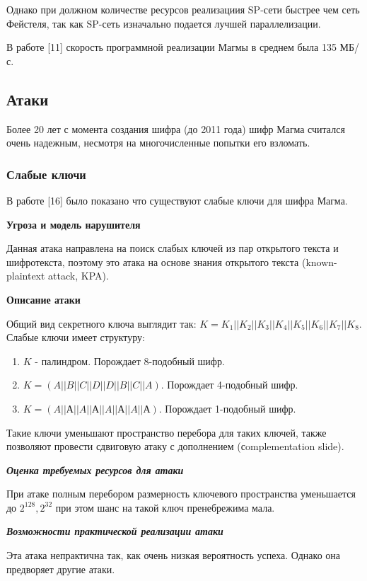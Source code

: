 \documentclass[colorthm]{./civarticle}
\begin{document}
Однако при должном количестве ресурсов реализациия SP-сети быстрее чем сеть Фейстеля, так как SP-сеть изначально подается лучшей параллелизации. 

В работе [11] скорость программной реализации Магмы в среднем была 135 МБ/с. 

\subsection{Атаки}

Более 20 лет с момента создания шифра (до 2011 года) шифр Магма считался очень надежным, несмотря на многочисленные попытки его взломать.

\subsubsection{Слабые ключи}

В работе [16] было показано что существуют слабые ключи для шифра Магма.

\textbf{Угроза и модель нарушителя} 

Данная атака направлена на поиск слабых ключей из пар открытого текста и шифротекста, поэтому это атака на основе знания открытого текста (known-plaintext attack, KPA).

\textbf{Описание атаки} 

Общий вид секретного ключа выглядит так: $K = K_1||K_2||K_3||K_4||K_5||K_6||K_7||K_8$. Слабые ключи имеет структуру:

\begin{enumerate}
    \item $K$ - палиндром. Порождает 8-подобный шифр.
    \item $K = (A||B||C||D||D||B||C||A)$. Порождает 4-подобный шифр.
    \item $K = (A||А||A||А||A||А||A||А)$. Порождает 1-подобный шифр.
\end{enumerate}

Такие ключи уменьшают пространство перебора для таких ключей, также позволяют провести сдвиговую атаку с дополнением (сomplementation slide).

\textbf{\emph{Оценка требуемых ресурсов для атаки}}

При атаке полным перебором размерность ключевого пространства уменьшается до $2^{128}, 2^{32}$ при этом шанс на такой ключ пренебрежима мала.

\textbf{\emph{Возможности практической реализации атаки}}

Эта атака непрактична так, как очень низкая вероятность успеха. Однако она предворяет другие атаки.
\end{document}
